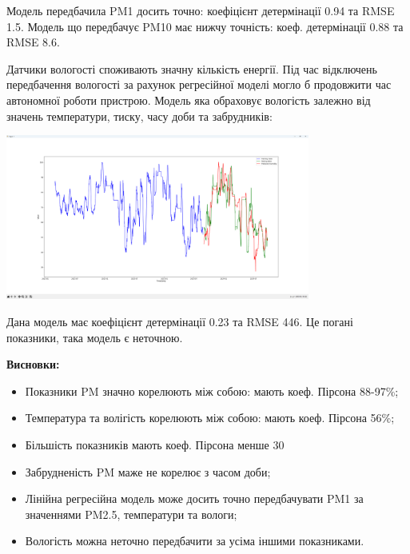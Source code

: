 \documentclass{article}
\begin{document}
Модель передбачила PM1 досить точно: коефіцієнт детермінації 0.94 та RMSE 1.5. Модель що передбачує PM10 має нижчу точність: коеф. детермінації 0.88 та RMSE 8.6.\\\indent

Датчики вологості споживають значну кількість енергії. Під час відключень передбачення вологості за рахунок регресійної моделі могло б продовжити час автономної роботи пристрою. Модель яка обраховує вологість залежно від значень температури, тиску, часу доби та забрудників:\\\indent
\begin{center}
    \includegraphics[width=100mm]{humidity}
\end{center}

Дана модель має коефіцієнт детермінації 0.23 та RMSE 446. Це погані показники, така модель є неточною.\\\indent


\newpage

\textbf{Висновки:}\\\indent
\begin{itemize}
	\item Показники PM значно корелюють між собою: мають коеф. Пірсона 88-97\%;
	\item Температура та волігість корелюють між собою: мають коеф. Пірсона 56\%;
	\item Більшість показників мають коеф. Пірсона менше 30%
	\item Забрудненість PM маже не корелює з часом доби;
	\item Лінійна регресійна модель може досить точно передбачувати PM1 за значеннями PM2.5, температури та вологи;
	\item Вологість можна неточно передбачити за усіма іншими показниками.
\end{itemize}
\end{document}
